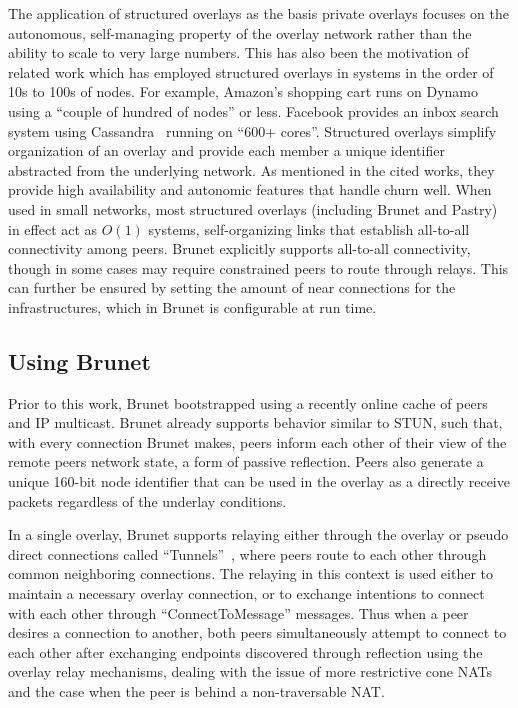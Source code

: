 The application of structured overlays as the basis private overlays focuses on
the autonomous, self-managing property of the overlay network rather than the
ability to scale to very large numbers.  This has also been the motivation of
related work which has employed structured overlays in systems in the order of
10s to 100s of nodes.  For example, Amazon's shopping cart runs on
Dynamo~\cite{dynamo} using a ``couple of hundred of nodes'' or less.  Facebook
provides an inbox search system using Cassandra~\cite{cassandra} running on
``600+ cores''.  Structured overlays simplify organization of an overlay and
provide each member a unique identifier abstracted from the underlying network.
As mentioned in the cited works, they provide high availability and autonomic
features that handle churn well.  When used in small networks, most structured
overlays (including Brunet and Pastry) in effect act as $O(1)$ systems,
self-organizing links that establish all-to-all connectivity among peers.
Brunet explicitly supports all-to-all connectivity, though in some cases may
require constrained peers to route through relays.  This can further be ensured
by setting the amount of near connections for the infrastructures, which in
Brunet is configurable at run time.

\subsection{Using Brunet}
\label{bs:brunet_bootstrapping}

Prior to this work, Brunet bootstrapped using a recently online cache of peers
and IP multicast.  Brunet already supports behavior similar to STUN, such that,
with every connection Brunet makes, peers inform each other of their view of
the remote peers network state, a form of passive reflection.  Peers
also generate a unique 160-bit node identifier that can be used in the overlay
as a directly receive packets regardless of the underlay conditions.

In a single overlay, Brunet supports relaying either through the
overlay or pseudo direct connections called ``Tunnels''~\cite{hpdc08_0}, where
peers route to each other through common neighboring connections.  The relaying
in this context is used either to maintain a necessary overlay connection, or
to exchange intentions to connect with each other through ``ConnectToMessage''
messages.  Thus when a peer desires a connection to another, both peers
simultaneously attempt to connect to each other after exchanging endpoints
discovered through reflection using the overlay relay mechanisms, dealing with
the issue of more restrictive cone NATs and the case when the peer is behind a
non-traversable NAT.  

